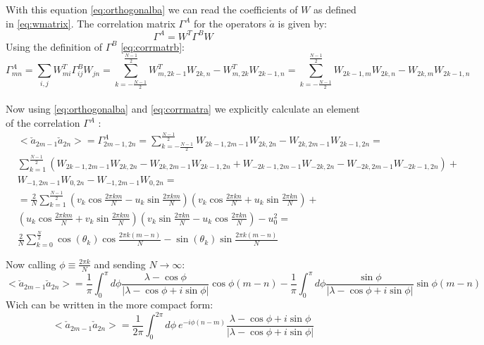 \documentclass[10pt,a4paper]{article}
\begin{document}
With this equation \ref{eq:orthogonalba} we can read the coefficients of $W$ as defined in \ref{eq:wmatrix}.
\newline
The correlation matrix $\Gamma^A$ for the operators $\check{a}$ is given by:
\begin{equation}
\Gamma^A=W^T\Gamma^BW
\end{equation}
Using the definition of $\Gamma^B$ \ref{eq:corrmatrb}:
\begin{equation}\label{eq:corrmatra}
\Gamma^A_{mn}= \sum_{i,j}  W^T_{mi} \Gamma^B_{ij} W_{jn}=\sum_{k=-\frac{N-1}{2}}^{\frac{N-1}{2}} W^T_{m , 2k-1}W_{2k,n}-W^T_{m , 2k}W_{2k-1,n}=\sum_{k=-\frac{N-1}{2}}^{\frac{N-1}{2}}  W_{2k-1,m}W_{2k,n}-W_{2k , m}W_{2k-1,n}
\end{equation}\\
Now using \ref{eq:orthogonalba} and \ref{eq:corrmatra} we explicitly calculate an element of the correlation $\Gamma^A$ :
\begin{equation}\begin{aligned}\label{eq:finiten}
&<\check{a}_{2m-1}\check{a}_{2n}>=\Gamma^A_{2m-1,2n}=\sum_{k=-\frac{N-1}{2}}^{\frac{N-1}{2}}  W_{2k-1,2m-1}W_{2k,2n}-W_{2k , 2m-1}W_{2k-1,2n}=\\
&\sum_{k=1}^{\frac{N-1}{2}}\left(  W_{2k-1,2m-1}W_{2k,2n}-W_{2k , 2m-1}W_{2k-1,2n}+W_{-2k-1,2m-1}W_{-2k,2n}-W_{-2k , 2m-1}W_{-2k-1,2n}\right)+ \\&W_{-1,2m-1}W_{0,2n}-W_{-1 , 2m-1}W_{0,2n}=\\
&=\frac{2}{N}\sum_{k=1}^{\frac{N-1}{2}}\left(v_k \cos \frac{2 \pi k m}{N}-u_k\sin \frac{2 \pi k m}{N}\right)\left(v_k\cos \frac{2 \pi k n}{N}+u_k\sin \frac{2 \pi k n}{N}\right)+\\& \left(u_k \cos \frac{2 \pi k m}{N}+v_k\sin \frac{2 \pi k m}{N}\right)\left(v_k\sin \frac{2 \pi k n}{N}-u_k\cos \frac{2 \pi k n}{N}\right)-u_0^2= \\
&\frac{2}{N}\sum_{k=0}^{\frac{N}{2}}\cos(\theta_k)\cos{\frac{2\pi k (m-n)}{N}}-\sin(\theta_k)\sin{\frac{2\pi k (m-n)}{N}}\\\\
\end{aligned}	
\end{equation}
Now calling $\phi \equiv \frac{2\pi k}{N}$ and sending $N\rightarrow\infty$:
\begin{equation}
<\check{a}_{2m-1}\check{a}_{2n}>=\frac{1}{\pi}\int_{0}^{\pi}d\phi    \frac{\lambda-\cos\phi}{|\lambda-\cos\phi+i\sin\phi|}\cos{\phi(m-n)}-\frac{1}{\pi}\int_{0}^{\pi}d\phi \frac{\sin\phi}{|\lambda-\cos\phi+i\sin\phi|}\sin{\phi(m-n)}
\end{equation}
Wich can be written in the more compact form:
\begin{equation}
<\check{a}_{2m-1}\check{a}_{2n}>=\frac{1}{2\pi}\int_{0}^{2\pi}d\phi \  e^{-i \phi  (n-m)} \frac{\lambda-\cos\phi+i\sin\phi}{|\lambda-\cos\phi+i\sin\phi|}
\end{equation}
\newpage
\end{document}
